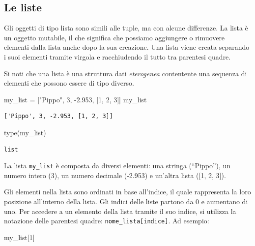 \documentclass[
  letterpaper,
  krantz2]{{[}./krantz{]}}
\newenvironment{Shaded}{\begin{snugshade}}{\end{snugshade}}
\newcommand{\BuiltInTok}[1]{\textcolor[rgb]{0.00,0.23,0.31}{#1}}
\newcommand{\DecValTok}[1]{\textcolor[rgb]{0.68,0.00,0.00}{#1}}
\newcommand{\FloatTok}[1]{\textcolor[rgb]{0.68,0.00,0.00}{#1}}
\newcommand{\NormalTok}[1]{\textcolor[rgb]{0.00,0.23,0.31}{#1}}
\newcommand{\OperatorTok}[1]{\textcolor[rgb]{0.37,0.37,0.37}{#1}}
\newcommand{\StringTok}[1]{\textcolor[rgb]{0.13,0.47,0.30}{#1}}
\begin{document}
\subsection{Le liste}\label{le-liste}

Gli oggetti di tipo lista sono simili alle tuple, ma con alcune
differenze. La lista è un oggetto mutabile, il che significa che
possiamo aggiungere o rimuovere elementi dalla lista anche dopo la sua
creazione. Una lista viene creata separando i suoi elementi tramite
virgola e racchiudendo il tutto tra parentesi quadre.

Si noti che una lista è una struttura dati \emph{eterogenea} contentente
una sequenza di elementi che possono essere di tipo diverso.

\begin{Shaded}
\begin{Highlighting}[]
\NormalTok{my\_list }\OperatorTok{=}\NormalTok{ [}\StringTok{"Pippo"}\NormalTok{, }\DecValTok{3}\NormalTok{, }\OperatorTok{{-}}\FloatTok{2.953}\NormalTok{, [}\DecValTok{1}\NormalTok{, }\DecValTok{2}\NormalTok{, }\DecValTok{3}\NormalTok{]]}
\NormalTok{my\_list}
\end{Highlighting}
\end{Shaded}

\begin{verbatim}
['Pippo', 3, -2.953, [1, 2, 3]]
\end{verbatim}

\begin{Shaded}
\begin{Highlighting}[]
\BuiltInTok{type}\NormalTok{(my\_list)}
\end{Highlighting}
\end{Shaded}

\begin{verbatim}
list
\end{verbatim}

La lista \texttt{my\_list} è composta da diversi elementi: una stringa
(``Pippo''), un numero intero (3), un numero decimale (-2.953) e
un'altra lista ({[}1, 2, 3{]}).

Gli elementi nella lista sono ordinati in base all'indice, il quale
rappresenta la loro posizione all'interno della lista. Gli indici delle
liste partono da 0 e aumentano di uno. Per accedere a un elemento della
lista tramite il suo indice, si utilizza la notazione delle parentesi
quadre: \texttt{nome\_lista{[}indice{]}}. Ad esempio:

\begin{Shaded}
\begin{Highlighting}[]
\NormalTok{my\_list[}\DecValTok{1}\NormalTok{]}
\end{Highlighting}
\end{Shaded}
\end{document}
